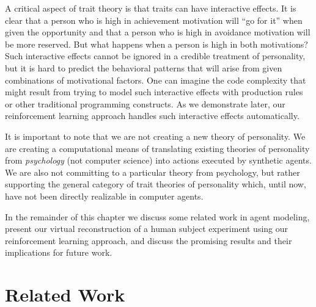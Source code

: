 A critical aspect of trait theory is that traits can have interactive effects.  It is clear that a person who is high in achievement motivation will ``go for it'' when given the opportunity and that a person who is high in avoidance motivation will be more reserved.  But what happens when a person is high in both motivations?  Such interactive effects cannot be ignored in a credible treatment of personality, but it is hard to predict the behavioral patterns that will arise from given combinations of motivational factors.  One can imagine the code complexity that might result from trying to model such interactive effects with production rules or other traditional programming constructs.  As we demonstrate later, our reinforcement learning approach handles such interactive effects automatically.

It is important to note that we are not creating a new theory of personality.  We are creating a computational means of translating existing theories of personality from {\em psychology} (not computer science) into actions executed by synthetic agents.  We are also not committing to a particular theory from psychology, but rather supporting the general category of trait theories of personality which, until now, have not been directly realizable in computer agents.

In the remainder of this chapter we discuss some related work in agent modeling, present our virtual reconstruction of a human subject experiment using our reinforcement learning approach, and discuss the promising results and their implications for future work.


\section{Related Work}\label{sec:related-work}

